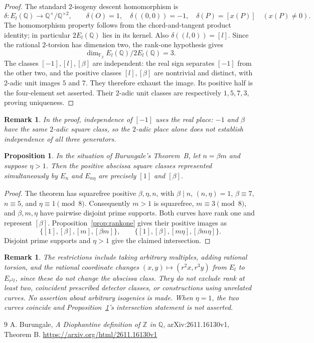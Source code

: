 \documentclass[11pt,a4paper]{article}
\newtheorem{proposition}[theorem]{Proposition}
\newtheorem{remark}[theorem]{Remark}
\newcommand{\Q}{\mathbb Q}
\begin{document}
\begin{proof}
The standard $2$-isogeny descent homomorphism is
\[
 \delta:E_l(\Q)\longrightarrow\Q^\times/\Q^{\times2},\qquad
 \delta(O)=1,\quad\delta((0,0))=-1,\quad
 \delta(P)=[x(P)]\quad(x(P)\ne0).
\]
The homomorphism property follows from the chord-and-tangent product identity; in particular $2E_l(\Q)$ lies in its kernel. Also $\delta((l,0))=[l]$. Since the rational $2$-torsion has dimension two, the rank-one hypothesis gives
\[
 \dim_{\mathbb F_2} E_l(\Q)/2E_l(\Q)=3.
\]
The classes $[-1],[l],[\beta]$ are independent: the real sign separates $[-1]$ from the other two, and the positive classes $[l],[\beta]$ are nontrivial and distinct, with $2$-adic unit images $5$ and $7$. They therefore exhaust the image. Its positive half is the four-element set asserted. Their $2$-adic unit classes are respectively $1,5,7,3$, proving uniqueness.
\end{proof}

\begin{remark}
In the proof, independence of $[-1]$ uses the real place: $-1$ and $\beta$ have the same $2$-adic square class, so the $2$-adic place alone does not establish independence of all three generators.
\end{remark}

\begin{proposition}\label{prop:pair}
In the situation of Burungale's Theorem~B, let $n=\beta m$ and suppose $\eta>1$. Then the positive abscissa square classes represented simultaneously by $E_n$ and $E_{n\eta}$ are precisely $[1]$ and $[\beta]$.
\end{proposition}
\begin{proof}
The theorem has squarefree positive $\beta,\eta,n$, with $\beta\mid n$, $(n,\eta)=1$, $\beta\equiv7$, $n\equiv5$, and $\eta\equiv1\pmod8$. Consequently $m>1$ is squarefree, $m\equiv3\pmod8$, and $\beta,m,\eta$ have pairwise disjoint prime supports. Both curves have rank one and represent $[\beta]$. Proposition~\ref{prop:rankone} gives their positive images as
\[
 \{[1],[\beta],[m],[\beta m]\},\qquad
 \{[1],[\beta],[m\eta],[\beta m\eta]\}.
\]
Disjoint prime supports and $\eta>1$ give the claimed intersection.
\end{proof}

\begin{remark}
The restrictions include taking arbitrary multiples, adding rational torsion, and the rational coordinate changes
$(x,y)\mapsto(r^2x,r^3y)$ from $E_l$ to $E_{r^2l}$, since these do not change the abscissa class. They do not exclude rank at least two, coincident prescribed detector classes, or constructions using unrelated curves. No assertion about arbitrary isogenies is made. When $\eta=1$, the two curves coincide and Proposition~\ref{prop:pair}'s intersection statement is not asserted.
\end{remark}

\begin{thebibliography}{9}
 A. Burungale, \emph{A Diophantine definition of $\mathbb Z$ in $\mathbb Q$}, arXiv:2611.16130v1, Theorem B. \url{https://arxiv.org/html/2611.16130v1}
\end{thebibliography}
\end{document}
